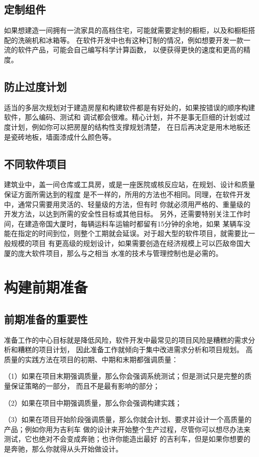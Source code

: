 \documentclass{article}
\begin{document}
\subsection{定制组件}
如果想建造一间拥有一流家具的高档住宅，可能就需要定制的橱柜，以及和橱柜搭配的洗碗机和冰箱等。
在软件开发中也有这种订制的情况，例如想要开发一款一流的软件产品，可能会自己编写科学计算函数，
以便获得更快的速度和更高的精度。

\subsection{防止过度计划}
适当的多层次规划对于建造房屋和构建软件都是有好处的，如果按错误的顺序构建软件，那么编码、测试和
调试都会很难。精心计划，并不是事无巨细的计划或过度计划，例如你可以把房屋的结构性支撑规划清楚，
在日后再决定是用木地板还是瓷砖地板，墙面漆成什么颜色等。

\subsection{不同软件项目}
建筑业中，盖一间仓库或工具房，或是一座医院或核反应站，在规划、设计和质量保证方面所需达到的程度
是不一样的，所用的方法也不相同。同理，在软件开发中，通常只需要用灵活的、轻量级的方法，但有时
你就必须用严格的、重量级的开发方法，以达到所需的安全性目标或其他目标。
另外，还需要特别关注工作时间，在建造帝国大厦时，每辆运料车运输时都留有15分钟的余地，如果
某辆车没能在指定的时间到位，则整个工期就会延误。对于超大型的软件项目，就需要比一般规模的项目
有更高级的规划设计，如果需要创造在经济规模上可以匹敌帝国大厦的庞大软件项目，那么与之相当
水准的技术与管理控制也是必需的。

\section{构建前期准备}
\subsection{前期准备的重要性}
准备工作的中心目标就是降低风险，软件开发中最常见的项目风险是糟糕的需求分析和糟糕的项目计划，
因此准备工作就倾向于集中改进需求分析和项目规划。
高质量的实践方法在项目的初期、中期和末期都强调质量：
\par
（1）如果在项目末期强调质量，那么你会强调系统测试；但是测试只是完整的质量保证策略的一部分，
而且不是最有影响的部分；
\par
（2）如果在项目中期强调质量，那么你会强调构建实践；
\par
（3）如果在项目开始阶段强调质量，那么你就会计划、要求并设计一个高质量的产品；例如你用为吉利车
做的设计来开始整个生产过程，尽管你可以想尽办法来测试，它也绝对不会变成奔驰；也许你能造出最好
的吉利车，但是如果你想要的是奔驰，那么你就得从头开始做设计。
\end{document}
